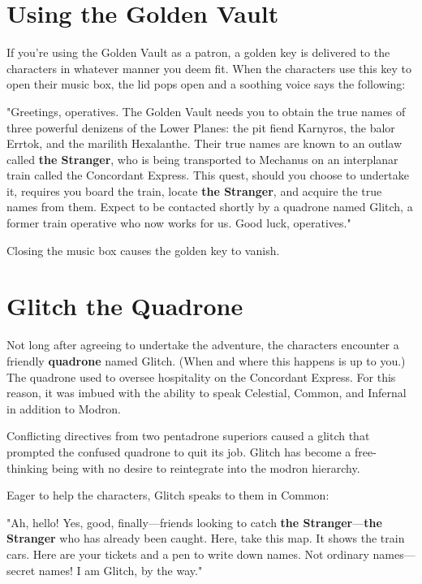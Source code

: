 \documentclass[10pt,a4paper,twoside,bg=print,twocolumn,openany,nodeprecatedcode]{dndarticle}
\begin{document}
\section{Using the Golden Vault}
If you're using the Golden Vault as a patron, a golden key is delivered to the characters in whatever manner you deem fit. When the characters use this key to open their music box, the lid pops open and a soothing voice says the following:

\begin{DndReadAloud}{}
"Greetings, operatives. The Golden Vault needs you to obtain the true names of three powerful denizens of the Lower Planes: the pit fiend Karnyros, the balor Errtok, and the marilith Hexalanthe. Their true names are known to an outlaw called \textbf{the Stranger}, who is being transported to Mechanus on an interplanar train called the Concordant Express. This quest, should you choose to undertake it, requires you board the train, locate \textbf{the Stranger}, and acquire the true names from them. Expect to be contacted shortly by a quadrone named Glitch, a former train operative who now works for us. Good luck, operatives."

\end{DndReadAloud}

Closing the music box causes the golden key to vanish.

\section{Glitch the Quadrone}
Not long after agreeing to undertake the adventure, the characters encounter a friendly \textbf{quadrone} named Glitch. (When and where this happens is up to you.) The quadrone used to oversee hospitality on the Concordant Express. For this reason, it was imbued with the ability to speak Celestial, Common, and Infernal in addition to Modron.

Conflicting directives from two pentadrone superiors caused a glitch that prompted the confused quadrone to quit its job. Glitch has become a free-thinking being with no desire to reintegrate into the modron hierarchy.

Eager to help the characters, Glitch speaks to them in Common:

\begin{DndReadAloud}{}
"Ah, hello! Yes, good, finally—friends looking to catch \textbf{the Stranger}—\textbf{the Stranger} who has already been caught. Here, take this map. It shows the train cars. Here are your tickets and a pen to write down names. Not ordinary names—secret names! I am Glitch, by the way."

\end{DndReadAloud}
\end{document}
